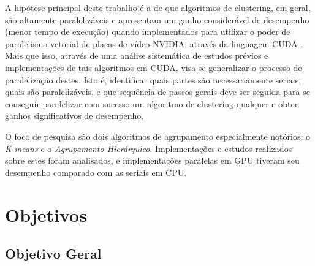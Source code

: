 \documentclass[12pt, %
openright, 
oneside, %
a4paper,    %
brazil]{facom-ufu-abntex2}
\def\qntAlgrtm{dois}
\begin{document}

A hipótese principal deste trabalho é a de que algoritmos de clustering, em geral, são altamente paralelizáveis e apresentam um ganho considerável de desempenho (menor tempo de execução) quando implementados para utilizar o poder de paralelismo vetorial de placas de vídeo NVIDIA, através da linguagem CUDA \cite{CUDAZone}. Mais que isso, através de uma análise sistemática de estudos prévios e implementações de tais algoritmos em CUDA, visa-se generalizar o processo de paralelização destes. Isto é, identificar quais partes são necessariamente seriais, quais são paralelizáveis, e que sequência de passos gerais deve ser seguida para se conseguir paralelizar com sucesso um algoritmo de clustering qualquer e obter ganhos significativos de desempenho.


O foco de pesquisa são \qntAlgrtm{} algoritmos de agrupamento especialmente notórios: o \textit{K-means} \cite{GPU-accelerated-K-Means} e o \textit{Agrupamento Hierárquico}. Implementações e estudos realizados sobre estes foram analisados, e implementações paralelas em GPU tiveram seu desempenho comparado com as seriais em CPU.





\section{Objetivos}




\subsection{Objetivo Geral}
\end{document}
